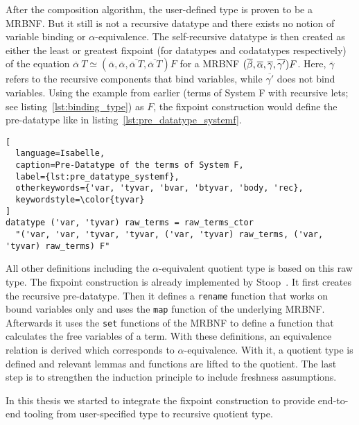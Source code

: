 After the composition algorithm, the user-defined type is proven to be a \ac{MRBNF}. But it still is not a recursive datatype and there exists no notion of variable binding or $\alpha$-equivalence. The self-recursive datatype is then created as either the least or greatest fixpoint (for datatypes and codatatypes respectively) of the equation $\overline{\alpha} \: T \simeq (\overline{\alpha}, \overline{\alpha},\overline{\overline{\alpha} \: T}, \overline{\overline{\alpha} \: T}) F$ for a \ac{MRBNF} $(\overline{\beta}, \overline{\alpha}, \overline{\gamma}, \overline{\gamma'}) F$. Here, $\overline{\gamma}$ refers to the recursive components that bind variables, while $\overline{\gamma'}$ does not bind variables. Using the example from earlier (terms of System F with recursive lets; see listing~\ref{lst:binding_type}) as $F$, the fixpoint construction would define the pre-datatype like in listing~\ref{lst:pre_datatype_systemf}.

\begin{lstlisting}[
  language=Isabelle,
  caption=Pre-Datatype of the terms of System F,
  label={lst:pre_datatype_systemf},
  otherkeywords={'var, 'tyvar, 'bvar, 'btyvar, 'body, 'rec},
  keywordstyle=\color{tyvar}
]
datatype ('var, 'tyvar) raw_terms = raw_terms_ctor
  "('var, 'var, 'tyvar, 'tyvar, ('var, 'tyvar) raw_terms, ('var, 'tyvar) raw_terms) F"
\end{lstlisting}

All other definitions including the $\alpha$-equivalent quotient type is based on this raw type. The fixpoint construction is already implemented by Stoop~\cite{mrbnf_fixpoint}. It first creates the recursive pre-datatype. Then it defines a \texttt{rename} function that works on bound variables only and uses the \texttt{map} function of the underlying \ac{MRBNF}. Afterwards it uses the \texttt{set} functions of the \ac{MRBNF} to define a function that calculates the free variables of a term. With these definitions, an equivalence relation is derived which corresponds to $\alpha$-equivalence. With it, a quotient type is defined and relevant lemmas and functions are lifted to the quotient. The last step is to strengthen the induction principle to include freshness assumptions.

In this thesis we started to integrate the fixpoint construction to provide end-to-end tooling from user-specified type to recursive quotient type.

